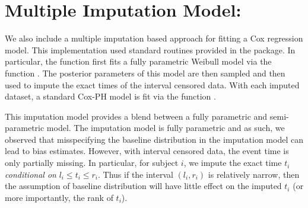 \documentclass[article]{jss}
\begin{document}
	
\section[impute]{Multiple Imputation Model: }	
	
	We also include a multiple imputation based approach for fitting a Cox regression model. This implementation used standard routines provided in the  package. In particular, the function  first fits a fully parametric Weibull model via the  function . The posterior parameters of this model are then sampled and then used to impute the exact times of the interval censored data. With each imputed dataset, a standard Cox-PH model is fit via the  function . 
	
	This imputation model provides a blend between a fully parametric and semi-parametric model. The imputation model is fully parametric and as such, we observed that misspecifying the baseline distribution in the imputation model can lead to bias estimates. However, with interval censored data, the event time is only partially missing. In particular, for subject $i$, we impute the exact time $t_i$ \emph{conditional on} $l_i \leq t_i \leq r_i$. Thus if the interval $(l_i, r_i)$ is relatively narrow, then the assumption of baseline distribution will have little effect on the imputed $t_i$ (or more importantly, the rank of $t_i$). 
\end{document}
